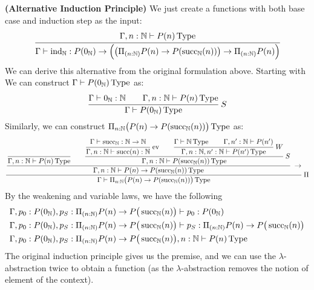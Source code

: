 \begin{remark}{\textbf{(Alternative Induction Principle)}}
    We just create a functions with both base case and induction step as the input:
    \begin{equation*}
        \cfrac{\Gamma,n:\mathbb{N}\vdash P(n)\operatorname{Type}}{\Gamma\vdash\operatorname{ind}_\mathbb{N}:P(0_\mathbb{N})\rightarrow\Big(\big(\Pi_{(n:\mathbb{N})}P(n)\rightarrow P(\operatorname{succ}_\mathbb{N}(n))\big)\rightarrow\Pi_{(n:\mathbb{N})}P(n)\Big)}
    \end{equation*}
    We can derive this alternative from the original formulation above. Starting with We can construct $\Gamma\vdash P(0_\mathbb{N})\operatorname{Type}$ as:
    \begin{equation*}
        \cfrac{\Gamma\vdash 0_\mathbb{N}:\mathbb{N}\qquad\Gamma,n:\mathbb{N}\vdash P(n)\operatorname{Type}}{\Gamma\vdash P(0_\mathbb{N})\operatorname{Type}}\ S
    \end{equation*}
    Similarly, we can construct $\Pi_{n:\mathbb{N}}\big(P(n)\to P(\operatorname{succ}_\mathbb{N}(n))\big)\operatorname{Type}$ as:
    \begin{equation*}
        \cfrac{\cfrac{\cfrac{}{\Gamma,n:\mathbb{N}\vdash P(n)\type}\qquad \cfrac{\cfrac{\Gamma\vdash\succnat:\mathbb{N}\to \mathbb{N}}{\Gamma, n:\mathbb{N}\vdash\operatorname{succ}(n):\mathbb{N}}\text{ ev}\qquad\cfrac{\Gamma\vdash \mathbb{N}\type\qquad \Gamma, n':\mathbb{N}\vdash P(n')}{\Gamma, n: \mathbb{N}, n':\mathbb{N}\vdash P(n')\type}\ W}{\Gamma, n:\mathbb{N}\vdash P(\succnat(n))\type}\ S}{\Gamma,n:\mathbb{N}\vdash P(n)\to P(\succnat(n))\type}\ \to}{\Gamma\vdash \Pi_{n:\mathbb{N}}\big(P(n)\to P(\succnat(n))\big)\type}\ \Pi
    \end{equation*}
    By the weakening and variable laws, we have the following
    \begin{equation*}
    \begin{aligned}
        &\Gamma,p_0:P(0_\mathbb{N}), p_S:\Pi_{(n:\mathbb{N})}P(n)\rightarrow P\big( \operatorname{succ}_\mathbb{N}(n) \big)\vdash p_0:P(0_\mathbb{N}) \\
        &\Gamma,p_0:P(0_\mathbb{N}), p_S:\Pi_{(n:\mathbb{N})}P(n)\rightarrow P\big( \operatorname{succ}_\mathbb{N}(n) \big)\vdash p_S:\Pi_{(n:\mathbb{N})}P(n)\rightarrow P\big( \operatorname{succ}_\mathbb{N}(n) \big) \\
        &\Gamma,p_0:P(0_\mathbb{N}), p_S:\Pi_{(n:\mathbb{N})}P(n)\rightarrow P\big( \operatorname{succ}_\mathbb{N}(n) \big), n:\mathbb{N}\vdash P(n)\operatorname{Type} \\
    \end{aligned}
    \end{equation*}
    The original induction principle gives us the premise, and we can use the $\lambda$-abstraction twice to obtain a function (as the $\lambda$-abstraction removes the notion of element of the context).

\end{remark}
